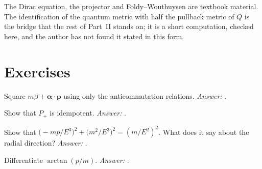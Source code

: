 \begin{standsbox}
The Dirac equation, the projector and Foldy--Wouthuysen are textbook material. The identification of the quantum metric with half the pullback metric of $Q$ is the bridge that the rest of Part~II stands on; it is a short computation, checked here, and the author has not found it stated in this form.
\end{standsbox}

\section*{Exercises}
\begin{exercise}Square $m\beta+\boldsymbol\alpha\cdot\mathbf p$ using only the anticommutation relations. \emph{Answer:} .\end{exercise}
\begin{exercise}Show that $P_+$ is idempotent. \emph{Answer:} .\end{exercise}
\begin{exercise}Show that $\bigl(-mp/E^3\bigr)^2+\bigl(m^2/E^3\bigr)^2=(m/E^2)^2$. What does it say about the radial direction? \emph{Answer:} .\end{exercise}
\begin{exercise}Differentiate $\arctan(p/m)$. \emph{Answer:} .\end{exercise}
